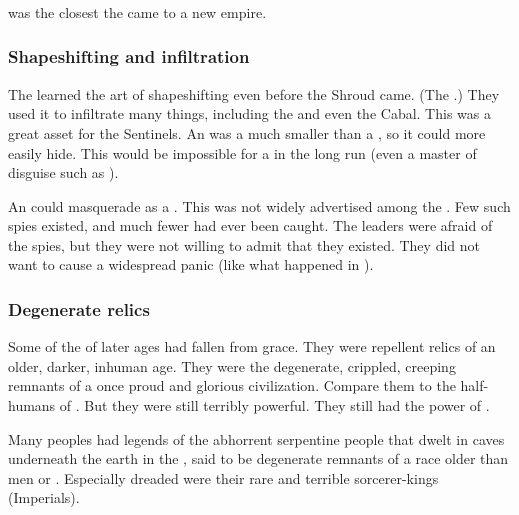 \subsubsection{\Saphyrae}
 was the closest the \ophidians came to a new empire. 





\subsubsection{Shapeshifting and infiltration}
The \ophidians learned the art of shapeshifting even before the Shroud came. 
(The \dragons {}.)
They used it to infiltrate many things, including the \aryothim and even the Cabal. 
This was a great asset for the Sentinels. 
An \ophidian was a much smaller \vertex than a \dragon, so it could more easily hide.
This would be impossible for a \dragon in the long run (even a master of disguise such as \Nzessuacrith). 

An \ophidian could masquerade as a \bezed. 
This was not widely advertised among the \resphain.
Few such spies existed, and much fewer had ever been caught. 
The \resphan leaders were afraid of the spies, but they were not willing to admit that they existed.
They did not want to cause a widespread panic (like what happened in \cite{TV:BattlestarGalactica}).





\subsubsection{Degenerate relics}
Some of the \ophidian {} of later ages had fallen from grace.
They were repellent relics of an older, darker, inhuman age. 
They were the degenerate, crippled, creeping remnants of a once proud and glorious civilization. 
Compare them to the half-humans of \cite{RobertEHoward:WormsoftheEarth}. 
But they were still terribly powerful.
They still had the power of . 

Many peoples had legends of the abhorrent serpentine people that dwelt in caves underneath the earth in the \wylde, said to be degenerate remnants of a race older than men or \scathae. 
Especially dreaded were their rare and terrible sorcerer-kings (Imperials).










